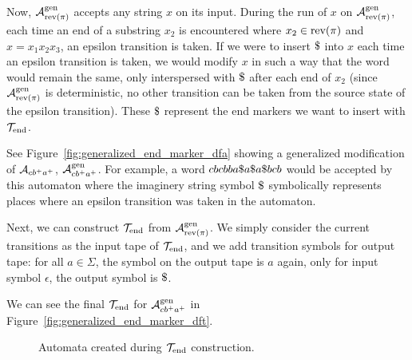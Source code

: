 Now, $\mathcal{A}^{\text{gen}}_{\text{rev(}\pi\text{)}}$ accepts any string $x$ on its input.
During the run of $x$ on $\mathcal{A}^{\text{gen}}_{\text{rev(}\pi\text{)}}$, each time an end of a substring $x_2$ is encountered where $x_2 \in \text{rev(}\pi\text{)}$ and $x = x_1 x_2 x_3$, an epsilon transition is taken.
If we were to insert $\marker$ into $x$ each time an epsilon transition is taken, we would modify $x$ in such a way that the word would remain the same, only interspersed with $\marker$ after each end of $x_2$ (since $\mathcal{A}^{\text{gen}}_{\text{rev(}\pi\text{)}}$ is deterministic, no other transition can be taken from the source state of the epsilon transition).
These $\marker$ represent the end markers we want to insert with $\mathcal{T}_{\text{end}}$.

See Figure~\ref{fig:generalized_end_marker_dfa} showing a generalized modification of \dfa $\mathcal{A}_{cb^+a^+}$, $\mathcal{A}^{\text{gen}}_{cb^+a^+}$.
For example, a word $cbcbba\$ a\$ a\$ bcb$ would be accepted by this automaton where the imaginery string symbol $\marker$ symbolically represents places where an epsilon transition was taken in the automaton.


Next, we can construct $\mathcal{T}_{\text{end}}$ from $\mathcal{A}^{\text{gen}}_{\text{rev(}\pi\text{)}}$.
We simply consider the current transitions as the input tape of $\mathcal{T}_{\text{end}}$,
and we add transition symbols for output tape: for all $a \in \Sigma$, the symbol on the output tape is $a$ again, only for input symbol $\epsilon$, the output symbol is $\marker$.

We can see the final $\mathcal{T}_{\text{end}}$ for $\mathcal{A}^{\text{gen}}_{cb^+a^+}$ in Figure~\ref{fig:generalized_end_marker_dft}.
\begin{figure}[ht]
    \centering
    \quad
    \quad
    \caption{
      Automata created during $\mathcal{T}_{\text{end}}$ construction.
    }
    \label{fig:end_marker_auts}%
\end{figure}

